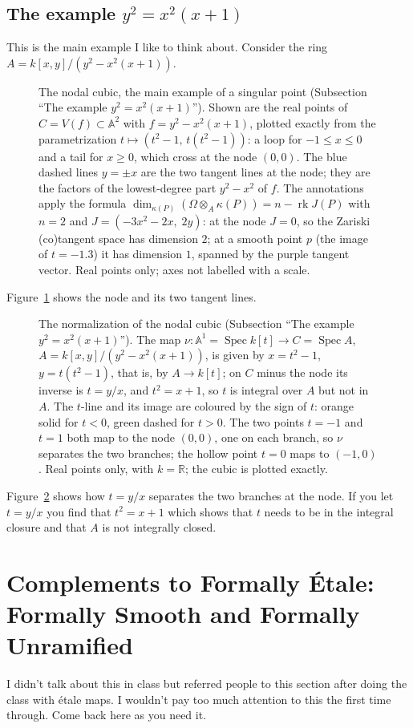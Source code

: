\documentclass[12pt]{article}
\numberwithin{equation}{section}
\theoremstyle{definition}
\theoremstyle{remark}
\newcommand{\RR}{\mathbb{R}}
\renewcommand{\AA}{\mathbb{A}}
\newcommand{\Spec}{\operatorname{Spec}}
\begin{document}
\subsection{The example $y^2=x^2(x+1)$}
This is the main example I like to think about. 
Consider the ring $A=k[x,y]/(y^2-x^2(x+1))$. 
\begin{figure}[H]
\centering

\caption{The nodal cubic, the main example of a singular point (Subsection ``The example $y^2=x^2(x+1)$''). Shown are the real points of $C=V(f)\subset\AA^2$ with $f=y^2-x^2(x+1)$, plotted exactly from the parametrization $t\mapsto(t^2-1,\,t(t^2-1))$: a loop for $-1\le x\le 0$ and a tail for $x\ge 0$, which cross at the node $(0,0)$. The blue dashed lines $y=\pm x$ are the two tangent lines at the node; they are the factors of the lowest-degree part $y^2-x^2$ of $f$. The annotations apply the formula $\dim_{\kappa(P)}(\Omega\otimes_A\kappa(P))=n-\operatorname{rk}J(P)$ with $n=2$ and $J=(-3x^2-2x,\;2y)$: at the node $J=0$, so the Zariski (co)tangent space has dimension $2$; at a smooth point $p$ (the image of $t=-1.3$) it has dimension $1$, spanned by the purple tangent vector. Real points only; axes not labelled with a scale.}\label{fig:nodal-cubic}
\end{figure}
Figure~\ref{fig:nodal-cubic} shows the node and its two tangent lines.
\begin{figure}[H]
\centering

\caption{The normalization of the nodal cubic (Subsection ``The example $y^2=x^2(x+1)$''). The map $\nu\colon\AA^1=\Spec k[t]\to C=\Spec A$, $A=k[x,y]/(y^2-x^2(x+1))$, is given by $x=t^2-1$, $y=t(t^2-1)$, that is, by $A\to k[t]$; on $C$ minus the node its inverse is $t=y/x$, and $t^2=x+1$, so $t$ is integral over $A$ but not in $A$. The $t$-line and its image are coloured by the sign of $t$: orange solid for $t<0$, green dashed for $t>0$. The two points $t=-1$ and $t=1$ both map to the node $(0,0)$, one on each branch, so $\nu$ separates the two branches; the hollow point $t=0$ maps to $(-1,0)$. Real points only, with $k=\RR$; the cubic is plotted exactly.}\label{fig:nodal-normalization}
\end{figure}
Figure~\ref{fig:nodal-normalization} shows how $t=y/x$ separates the two branches at the node.
If you let $t=y/x$ you find that $t^2=x+1$ which shows that $t$ needs to be in the integral closure and that $A$ is not integrally closed.

\section{Complements to Formally \'Etale: Formally Smooth and Formally Unramified}
I didn't talk about this in class but referred people to this section after doing the class with \'etale maps.
I wouldn't pay too much attention to this the first time through.
Come back here as you need it.
\end{document}
